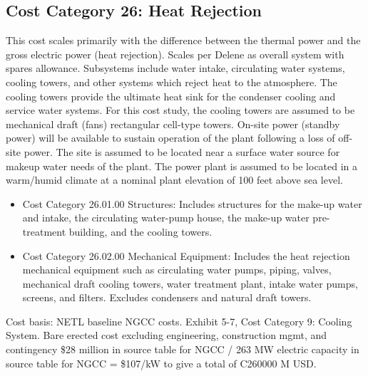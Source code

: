 \subsection{Cost Category 26: Heat Rejection} 

This cost scales primarily with the difference between the thermal power and the gross electric power (heat rejection). Scales per Delene as overall system with spares allowance.  Subsystems include water intake, circulating water systems, cooling towers, and other systems which reject heat to the atmosphere. The cooling towers provide the ultimate heat sink for the condenser cooling and service water systems.  For this cost study, the cooling towers are assumed to be mechanical draft (fans) rectangular cell-type towers.  On-site power (standby power) will be available to sustain operation of the plant following a loss of off-site power. The site is assumed to be located near a surface water source for makeup water needs of the plant.  The power plant is assumed to be located in a warm/humid climate at a nominal plant elevation of 100 feet above sea level.  

\begin{itemize}
    \item Cost Category 26.01.00 Structures: Includes structures for the make-up water and intake, the circulating water-pump house, the make-up water pre-treatment building, and the cooling towers.
    \item Cost Category 26.02.00 Mechanical Equipment: Includes the heat rejection mechanical equipment such as circulating water pumps, piping, valves, mechanical draft cooling towers, water treatment plant, intake water pumps, screens, and filters. Excludes condensers and natural draft towers.
\end{itemize}

Cost basis: NETL baseline NGCC costs. Exhibit 5-7, Cost Category 9: Cooling System. Bare erected cost excluding engineering, construction mgmt, and contingency \$28 million in source table for NGCC / 263 MW electric capacity in source table for NGCC = \$107/kW to give a total of C260000 M USD.









